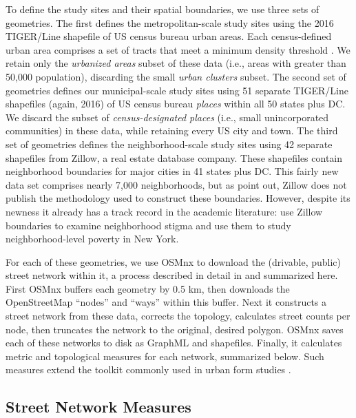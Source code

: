 \documentclass[11pt]{article}
\begin{document}
\begin{multicols}{2}
To define the study sites and their spatial boundaries, we use three sets of geometries. The first defines the metropolitan-scale study sites using the 2016 TIGER/Line shapefile of US census bureau urban areas. Each census-defined urban area comprises a set of tracts that meet a minimum density threshold \citep{u.s._census_bureau_2010_2010}. We retain only the \emph{urbanized areas} subset of these data (i.e., areas with greater than 50,000 population), discarding the small \emph{urban clusters} subset. The second set of geometries defines our municipal-scale study sites using 51 separate TIGER/Line shapefiles (again, 2016) of US census bureau \emph{places} within all 50 states plus DC. We discard the subset of \emph{census-designated places} (i.e., small unincorporated communities) in these data, while retaining every US city and town. The third set of geometries defines the neighborhood-scale study sites using 42 separate shapefiles from Zillow, a real estate database company. These shapefiles contain neighborhood boundaries for major cities in 41 states plus DC. This fairly new data set comprises nearly 7,000 neighborhoods, but as \citet{schernthanner_spatial_2016} point out, Zillow does not publish the methodology used to construct these boundaries. However, despite its newness it already has a track record in the academic literature: \citet{besbris_effect_2015} use Zillow boundaries to examine neighborhood stigma and \citet{albrecht_indicator_2014} use them to study neighborhood-level poverty in New York.

For each of these geometries, we use OSMnx to download the (drivable, public) street network within it, a process described in detail in \citet{boeing_osmnx:_2017} and summarized here. First OSMnx buffers each geometry by 0.5 km, then downloads the OpenStreetMap \enquote{nodes} and \enquote{ways} within this buffer. Next it constructs a street network from these data, corrects the topology, calculates street counts per node, then truncates the network to the original, desired polygon. OSMnx saves each of these networks to disk as GraphML and shapefiles. Finally, it calculates metric and topological measures for each network, summarized below. Such measures extend the toolkit commonly used in urban form studies \citep{talen_measuring_2003, ewing_travel_2010}.

\subsection{Street Network Measures}


\end{multicols}
\end{document}
